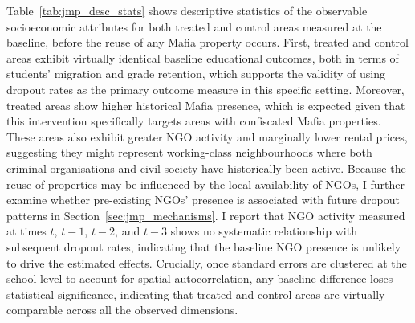 \documentclass[12pt]{article}
\theoremstyle{plain}
\theoremstyle{plain}
\theoremstyle{plain}
\theoremstyle{definition}
\theoremstyle{plain}
\theoremstyle{definition}
\theoremstyle{plain}
\theoremstyle{remark}
\theoremstyle{definition}
\theoremstyle{definition}
\theoremstyle{plain}
\begin{document}
Table~\ref{tab:jmp_desc_stats} shows descriptive statistics of the observable socioeconomic attributes for both treated and control areas measured at the baseline, before the reuse of any Mafia property occurs. First, treated and control areas exhibit virtually identical baseline educational outcomes, both in terms of students' migration and grade retention, which supports the validity of using dropout rates as the primary outcome measure in this specific setting. Moreover, treated areas show higher historical Mafia presence, which is expected given that this intervention specifically targets areas with confiscated Mafia properties. These areas also exhibit greater NGO activity and marginally lower rental prices, suggesting they might represent working-class neighbourhoods where both criminal organisations and civil society have historically been active. Because the reuse of properties may be influenced by the local availability of NGOs, I further examine whether pre-existing NGOs' presence is associated with future dropout patterns in Section~\ref{sec:jmp_mechanisms}. I report that NGO activity measured at times $t$, $t-1$, $t-2$, and $t-3$ shows no systematic relationship with subsequent dropout rates, indicating that the baseline NGO presence is unlikely to drive the estimated effects. Crucially, once standard errors are clustered at the school level to account for spatial autocorrelation, any baseline difference loses statistical significance, indicating that treated and control areas are virtually comparable across all the observed dimensions.
\end{document}
